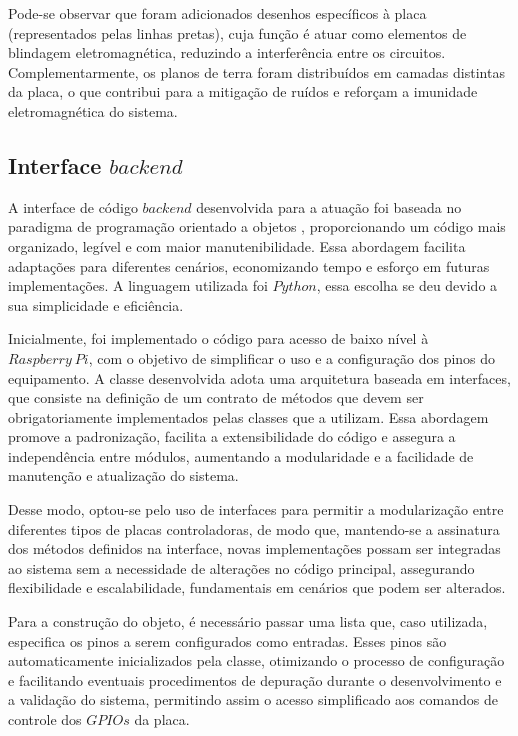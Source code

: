 \documentclass{ecatfg}
\begin{document}
Pode-se observar que foram adicionados desenhos específicos à placa (representados pelas linhas pretas), cuja função é atuar como elementos de blindagem eletromagnética, reduzindo a interferência entre os circuitos. Complementarmente, os planos de terra foram distribuídos em camadas distintas da placa, o que contribui para a mitigação de ruídos e reforçam a imunidade eletromagnética do sistema.\par

\subsection{Interface $backend$}
A interface de código $backend$ desenvolvida para a atuação foi baseada no paradigma de programação orientado a objetos \cite{oop}, proporcionando um código mais organizado, legível e com maior manutenibilidade. Essa abordagem facilita adaptações para diferentes cenários, economizando tempo e esforço em futuras implementações. A linguagem utilizada foi $Python$, essa escolha se deu devido a sua simplicidade e eficiência.\par

Inicialmente, foi implementado o código para acesso de baixo nível à $Raspberry\ Pi$, com o objetivo de simplificar o uso e a configuração dos pinos do equipamento. A classe desenvolvida adota uma arquitetura baseada em interfaces, que consiste na definição de um contrato de métodos que devem ser obrigatoriamente implementados pelas classes que a utilizam. Essa abordagem promove a padronização, facilita a extensibilidade do código e assegura a independência entre módulos, aumentando a modularidade e a facilidade de manutenção e atualização do sistema.\par

Desse modo, optou-se pelo uso de interfaces para permitir a modularização entre diferentes tipos de placas controladoras, de modo que, mantendo-se a assinatura dos métodos definidos na interface, novas implementações possam ser integradas ao sistema sem a necessidade de alterações no código principal, assegurando flexibilidade e escalabilidade, fundamentais em cenários que podem ser alterados.\par

Para a construção do objeto, é necessário passar uma lista que, caso utilizada, especifica os pinos a serem configurados como entradas. Esses pinos são automaticamente inicializados pela classe, otimizando o processo de configuração e facilitando eventuais procedimentos de depuração durante o desenvolvimento e a validação do sistema, permitindo assim o acesso simplificado aos comandos de controle dos $GPIOs$ da placa.\par
\end{document}
